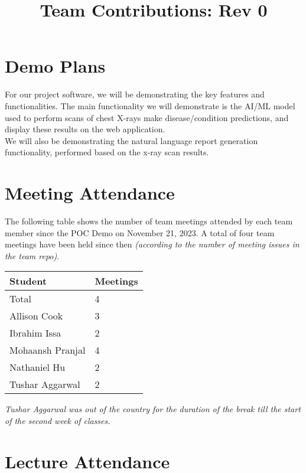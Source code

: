 \documentclass{article}
\title{Team Contributions: Rev 0\\\progname}
\author{\authname}
\date{}
\begin{document}
\maketitle

\section{Demo Plans}

For our project software, we will be demonstrating the key features and
functionalities. The main functionality we will demonstrate is the AI/ML model
used to perform scans of chest X-rays make disease/condition predictions, and
display these results on the web application. \\
We will also be demonstrating the natural language report generation
functionality, performed based on the x-ray scan results.

\section{Meeting Attendance}

The following table shows the number of team meetings attended by each team
member since the POC Demo on November 21, 2023. A total of four team meetings
have been held since then \textit{(according to the number of meeting issues
in the team repo)}.

\begin{table}[H]
  \centering
  \begin{tabular}{ll}
    \toprule
    \textbf{Student} & \textbf{Meetings} \\
    \midrule
    Total & 4 \\
    Allison Cook & 3 \\
    Ibrahim Issa & 2 \\
    Mohaansh Pranjal & 4 \\
    Nathaniel Hu & 2 \\
    Tushar Aggarwal & 2 \\
    \bottomrule
  \end{tabular}
\end{table}

\noindent \textit{Tushar Aggarwal was out of the country for the duration of
the break till the start of the second week of classes.}

\section{Lecture Attendance}
\end{document}
